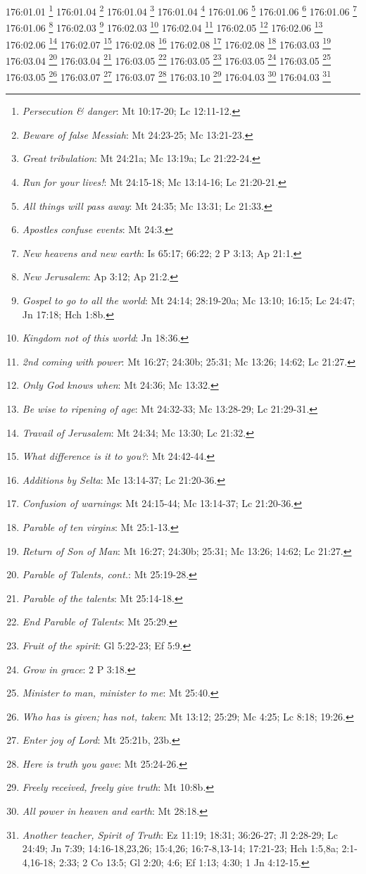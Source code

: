 176:01.01 \footnote{\textit{Persecution & danger}: Mt 10:17-20; Lc 12:11-12.}
176:01.04 \footnote{\textit{Beware of false Messiah}: Mt 24:23-25; Mc 13:21-23.}
176:01.04 \footnote{\textit{Great tribulation}: Mt 24:21a; Mc 13:19a; Lc 21:22-24.}
176:01.04 \footnote{\textit{Run for your lives!}: Mt 24:15-18; Mc 13:14-16; Lc 21:20-21.}
176:01.06 \footnote{\textit{All things will pass away}: Mt 24:35; Mc 13:31; Lc 21:33.}
176:01.06 \footnote{\textit{Apostles confuse events}: Mt 24:3.}
176:01.06 \footnote{\textit{New heavens and new earth}: Is 65:17; 66:22; 2 P 3:13; Ap 21:1.}
176:01.06 \footnote{\textit{New Jerusalem}: Ap 3:12; Ap 21:2.}
176:02.03 \footnote{\textit{Gospel to go to all the world}: Mt 24:14; 28:19-20a; Mc 13:10; 16:15; Lc 24:47; Jn 17:18; Hch 1:8b.}
176:02.03 \footnote{\textit{Kingdom not of this world}: Jn 18:36.}
176:02.04 \footnote{\textit{2nd coming with power}: Mt 16:27; 24:30b; 25:31; Mc 13:26; 14:62; Lc 21:27.}
176:02.05 \footnote{\textit{Only God knows when}: Mt 24:36; Mc 13:32.}
176:02.06 \footnote{\textit{Be wise to ripening of age}: Mt 24:32-33; Mc 13:28-29; Lc 21:29-31.}
176:02.06 \footnote{\textit{Travail of Jerusalem}: Mt 24:34; Mc 13:30; Lc 21:32.}
176:02.07 \footnote{\textit{What difference is it to you?}: Mt 24:42-44.}
176:02.08 \footnote{\textit{Additions by Selta}: Mc 13:14-37; Lc 21:20-36.}
176:02.08 \footnote{\textit{Confusion of warnings}: Mt 24:15-44; Mc 13:14-37; Lc 21:20-36.}
176:02.08 \footnote{\textit{Parable of ten virgins}: Mt 25:1-13.}
176:03.03 \footnote{\textit{Return of Son of Man}: Mt 16:27; 24:30b; 25:31; Mc 13:26; 14:62; Lc 21:27.}
176:03.04 \footnote{\textit{Parable of Talents, cont.}: Mt 25:19-28.}
176:03.04 \footnote{\textit{Parable of the talents}: Mt 25:14-18.}
176:03.05 \footnote{\textit{End Parable of Talents}: Mt 25:29.}
176:03.05 \footnote{\textit{Fruit of the spirit}: Gl 5:22-23; Ef 5:9.}
176:03.05 \footnote{\textit{Grow in grace}: 2 P 3:18.}
176:03.05 \footnote{\textit{Minister to man, minister to me}: Mt 25:40.}
176:03.05 \footnote{\textit{Who has is given; has not, taken}: Mt 13:12; 25:29; Mc 4:25; Lc 8:18; 19:26.}
176:03.07 \footnote{\textit{Enter joy of Lord}: Mt 25:21b, 23b.}
176:03.07 \footnote{\textit{Here is truth you gave}: Mt 25:24-26.}
176:03.10 \footnote{\textit{Freely received, freely give truth}: Mt 10:8b.}
176:04.03 \footnote{\textit{All power in heaven and earth}: Mt 28:18.}
176:04.03 \footnote{\textit{Another teacher, Spirit of Truth}: Ez 11:19; 18:31; 36:26-27; Jl 2:28-29; Lc 24:49; Jn 7:39; 14:16-18,23,26; 15:4,26; 16:7-8,13-14; 17:21-23; Hch 1:5,8a; 2:1-4,16-18; 2:33; 2 Co 13:5; Gl 2:20; 4:6; Ef 1:13; 4:30; 1 Jn 4:12-15.}

